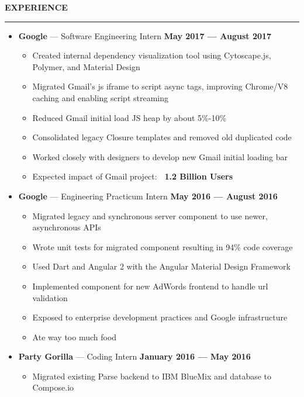 \documentclass[10pt, oneside]{letter}
\newcommand{\linespaceshit} {
  \vspace{0.05in}
  \hrule
  \vspace{0.05in}
}
\begin{document}
  \textbf{EXPERIENCE}
  \linespaceshit
    \begin{adjustwidth}{0.1in}{0pt}

      \begin{itemize}
        \item
          \textbf{Google} --- Software Engineering Intern \hfill  \textbf{May 2017 --- August 2017}
            \begin{itemize}
              \item Created internal dependency visualization tool using Cytoscape.js, Polymer, and Material Design
              \item Migrated Gmail's js iframe to script async tags, improving Chrome/V8 caching and enabling script streaming
              \item Reduced Gmail initial load JS heap by about 5\%-10\%
              \item Consolidated legacy Closure templates and removed old duplicated code
              \item Worked closely with designers to develop new Gmail initial loading bar
              \item Expected impact of Gmail project: \textbf{~1.2 Billion Users}
            \end{itemize}
        \item
          \textbf{Google} --- Engineering Practicum Intern \hfill  \textbf{May 2016 --- August 2016}
            \begin{itemize}
              \item Migrated legacy and synchronous server component to use newer, asynchronous APIs
              \item Wrote unit tests for migrated component resulting in 94\% code coverage
              \item Used Dart and Angular 2 with the Angular Material Design Framework
              \item Implemented component for new AdWords frontend to handle url validation
              \item Exposed to enterprise development practices and Google infrastructure
              \item Ate way too much food
            \end{itemize}
        \item
          \textbf{Party Gorilla} --- Coding Intern \hfill \textbf{January 2016 --- May 2016}
            \begin{itemize}
              \item Migrated existing Parse backend to IBM BlueMix and database to Compose.io

\end{itemize}
\end{itemize}
\end{adjustwidth}
\end{document}
